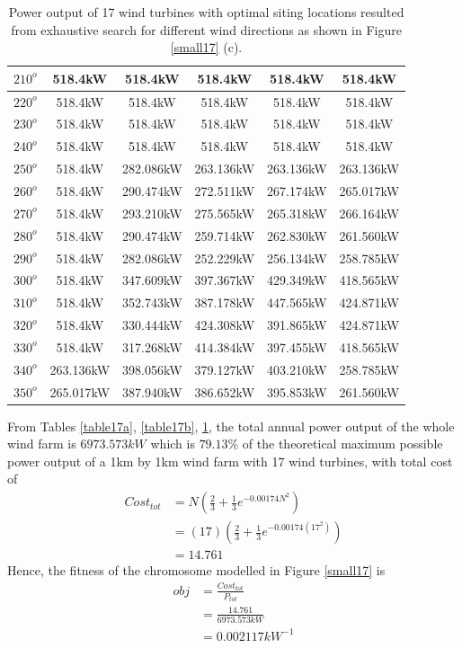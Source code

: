 \begin{table}[H]
\begin{tabular}{|c|c|c|c|c|c|}
		$210^o$	& 518.4kW	& 518.4kW	& 518.4kW	& 518.4kW	& 518.4kW	\\ \hline
		$220^o$	& 518.4kW	& 518.4kW	& 518.4kW	& 518.4kW	& 518.4kW	\\ \hline
		$230^o$	& 518.4kW	& 518.4kW	& 518.4kW	& 518.4kW	& 518.4kW	\\ \hline
		$240^o$	& 518.4kW	& 518.4kW	& 518.4kW	& 518.4kW	& 518.4kW	\\ \hline
		$250^o$	& 518.4kW	& 282.086kW	& 263.136kW	& 263.136kW	& 263.136kW	\\ \hline
		$260^o$	& 518.4kW	& 290.474kW	& 272.511kW	& 267.174kW	& 265.017kW	\\ \hline
		$270^o$	& 518.4kW	& 293.210kW	& 275.565kW	& 265.318kW	& 266.164kW	\\ \hline
		$280^o$	& 518.4kW	& 290.474kW	& 259.714kW	& 262.830kW	& 261.560kW	\\ \hline
		$290^o$	& 518.4kW	& 282.086kW	& 252.229kW	& 256.134kW	& 258.785kW	\\ \hline
		$300^o$	& 518.4kW	& 347.609kW	& 397.367kW	& 429.349kW	& 418.565kW	\\ \hline
		$310^o$	& 518.4kW	& 352.743kW	& 387.178kW	& 447.565kW	& 424.871kW	\\ \hline
		$320^o$	& 518.4kW	& 330.444kW	& 424.308kW	& 391.865kW	& 424.871kW	\\ \hline
		$330^o$	& 518.4kW	& 317.268kW	& 414.384kW	& 397.455kW	& 418.565kW	\\ \hline
		$340^o$	& 263.136kW	& 398.056kW	& 379.127kW	& 403.210kW	& 258.785kW	\\ \hline
		$350^o$	& 265.017kW	& 387.940kW	& 386.652kW	& 395.853kW	& 261.560kW	\\ \hline
        	\end{tabular}
        	\caption{Power output of 17 wind turbines with optimal siting locations resulted from exhaustive search for different wind directions as shown in Figure \ref{small17} (c).}
        	\label{table17c}
        \end{table}
        \doublespacing
        
        From Tables \ref{table17a}, \ref{table17b}, \ref{table17c}, the total annual power output of the whole wind farm is $6973.573kW$ which is $79.13\%$ of the theoretical maximum possible power output of a 1km by 1km wind farm with 17 wind turbines, with total cost of
        \begin{align*}
            Cost_{tot}
            &= N\left(\frac{2}{3} + \frac{1}{3}e^{-0.00174N^2}\right) \\
            &= \left(17\right)\left(\frac{2}{3} + \frac{1}{3}e^{-0.00174\left(17^2\right)}\right) \\
            &=14.761
        \end{align*}
        Hence, the fitness of the chromosome modelled in Figure \ref{small17} is
        \begin{align*}
            obj
            &=\frac{Cost_{tot}}{P_{tot}} \\
            &=\frac{14.761}{6973.573kW} \\
            &=0.002117kW^{-1}
        \end{align*}
        
